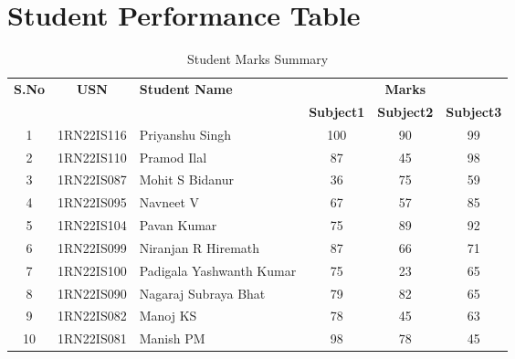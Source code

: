 \documentclass{article}
\begin{document}
	\section*{Student Performance Table}
	\begin{table}[h]
		
		
		\begin{tabular}{|c|c||l||c||c||c|}
			\hline
	\rowcolor{gray!40}\textbf{S.No} & \textbf{USN} &\textbf{Student Name} & \multicolumn{3}{c|}{\textbf{Marks}} \\
	\cline{4-6}
	\rowcolor{gray!40} & & & \textbf{Subject1} &\textbf{Subject2} &\textbf{Subject3}\\
	\hline
			\cellcolor{gray!30}1&1RN22IS116 &Priyanshu Singh&100&90&99\\
			\hline
			\cellcolor{gray!30}2&1RN22IS110 &Pramod Ilal&87&45&98\\
			\hline
			\cellcolor{gray!30}3&1RN22IS087 &Mohit S Bidanur&36&75&59\\
			\hline
			\cellcolor{gray!30}4&1RN22IS095 &Navneet V&67&57&85\\
			\hline
			\cellcolor{gray!30}5&1RN22IS104 &Pavan Kumar&75 &89 &92\\
			\hline
			\cellcolor{gray!30}6&1RN22IS099 &Niranjan R Hiremath&87 &66 &71\\
			\hline
			\cellcolor{gray!30}7&1RN22IS100 &Padigala Yashwanth Kumar&75 &23 &65\\
			\hline
			\cellcolor{gray!30}8&1RN22IS090 &Nagaraj Subraya Bhat&79 &82 &65\\
			\hline
			\cellcolor{gray!30}9&1RN22IS082 &Manoj KS&78 &45 &63\\
			\hline
			\cellcolor{gray!30}10&1RN22IS081 &Manish PM&98 &78 &45\\
			\hline
			\end{tabular}
		\centering
		\caption{Student Marks Summary}
		\label{tab:Student Marks Summary}
	\end{table}
\end{document}
